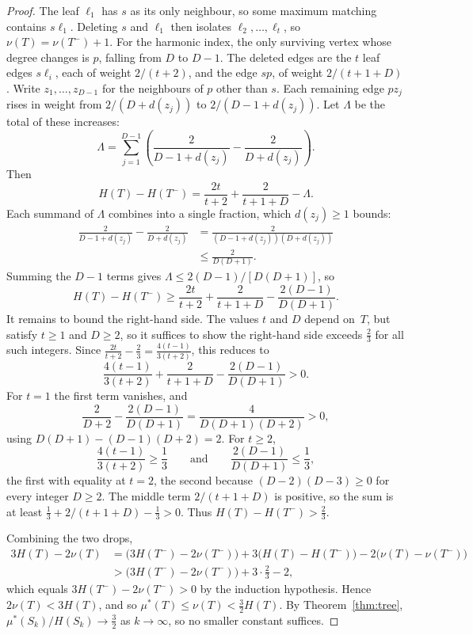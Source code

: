 \documentclass[10pt,a4paper]{amsart}
\newcommand{\mustar}{\mu^{*}}
\begin{document}
\begin{proof}
The leaf $\ell_1$ has $s$ as its only neighbour, so some maximum matching
contains $s\ell_1$.  Deleting $s$ and $\ell_1$ then isolates
$\ell_2, \ldots, \ell_t$, so $\nu(T) = \nu(T^-) + 1$.  For the harmonic
index, the only surviving vertex whose degree changes is $p$, falling from
$D$ to $D-1$.  The deleted edges are the $t$ leaf edges $s\ell_i$, each of
weight $2/(t+2)$, and the edge $sp$, of weight $2/(t+1+D)$.  Write
$z_1, \ldots, z_{D-1}$ for the neighbours of $p$ other than $s$.  Each
remaining edge $pz_j$ rises in weight from $2/(D+d(z_j))$ to
$2/(D-1+d(z_j))$.  Let $\Lambda$ be the total of these increases:
\[
  \Lambda = \sum_{j=1}^{D-1}
      \left( \frac{2}{D-1+d(z_j)} - \frac{2}{D+d(z_j)} \right).
\]
Then
\[
  H(T) - H(T^-) = \frac{2t}{t+2} + \frac{2}{t+1+D} - \Lambda.
\]
Each summand of $\Lambda$ combines into a single fraction, which $d(z_j) \ge 1$
bounds:
\begin{align*}
  \frac{2}{D-1+d(z_j)} - \frac{2}{D+d(z_j)}
    &= \frac{2}{(D-1+d(z_j))(D+d(z_j))} \\
    &\le \frac{2}{D(D+1)}.
\end{align*}
Summing the $D-1$ terms gives $\Lambda \le 2(D-1)/[D(D+1)]$, so
\[
  H(T) - H(T^-) \ge \frac{2t}{t+2} + \frac{2}{t+1+D}
                     - \frac{2(D-1)}{D(D+1)}.
\]
It remains to bound the right-hand side.  The values $t$ and $D$ depend
on~$T$, but satisfy $t \ge 1$ and $D \ge 2$, so it suffices to show the
right-hand side exceeds $\tfrac{2}{3}$ for all such integers.  Since
$\tfrac{2t}{t+2} - \tfrac{2}{3} = \tfrac{4(t-1)}{3(t+2)}$, this reduces to
\[
  \frac{4(t-1)}{3(t+2)} + \frac{2}{t+1+D}
    - \frac{2(D-1)}{D(D+1)} > 0.
\]
For $t = 1$ the first term vanishes, and
\[
  \frac{2}{D+2} - \frac{2(D-1)}{D(D+1)} = \frac{4}{D(D+1)(D+2)} > 0,
\]
using $D(D+1) - (D-1)(D+2) = 2$.  For $t \ge 2$,
\[
  \frac{4(t-1)}{3(t+2)} \ge \frac{1}{3}
  \qquad\text{and}\qquad
  \frac{2(D-1)}{D(D+1)} \le \frac{1}{3},
\]
the first with equality at $t = 2$, the second because
$(D-2)(D-3) \ge 0$ for every integer $D \ge 2$.  The middle term
$2/(t+1+D)$ is positive, so the sum is at least
$\tfrac{1}{3} + 2/(t+1+D) - \tfrac{1}{3} > 0$.  Thus
$H(T) - H(T^-) > \tfrac{2}{3}$.

Combining the two drops,
\begin{align*}
  3H(T) - 2\nu(T)
    &= \bigl(3H(T^-) - 2\nu(T^-)\bigr)
      + 3\bigl(H(T) - H(T^-)\bigr) - 2\bigl(\nu(T) - \nu(T^-)\bigr) \\
    &> \bigl(3H(T^-) - 2\nu(T^-)\bigr) + 3 \cdot \tfrac{2}{3} - 2,
\end{align*}
which equals $3H(T^-) - 2\nu(T^-) > 0$ by the induction hypothesis.  Hence
$2\nu(T) < 3H(T)$, and so $\mustar(T) \le \nu(T) < \tfrac{3}{2} H(T)$.
By Theorem~\ref{thm:tree}, $\mustar(S_k)/H(S_k) \to \tfrac{3}{2}$ as
$k \to \infty$, so no smaller constant suffices.
\end{proof}
\end{document}
